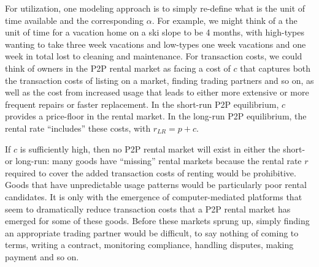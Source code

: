 \documentclass[11pt]{article}
\begin{document}
For utilization, one modeling approach is to simply re-define what is the unit of time available and the corresponding $\alpha$. 
For example, we might think of a the unit of time for a vacation home on a ski slope to be 4 months, with high-types wanting to take three week vacations and low-types one week vacations and one week in total lost to cleaning and maintenance.      
For transaction costs, we could think of owners in the P2P rental market as facing a cost of $c$ that captures both the transaction costs of listing on a market, finding trading partners and so on, as well as the cost from increased usage that leads to either more extensive or more frequent repairs or faster replacement.
In the short-run P2P equilibrium, $c$ provides a price-floor in the rental market.  
In the long-run P2P equilibrium, the rental rate ``includes'' these costs, with $r_{LR} = p + c$. 

If $c$ is sufficiently high, then no P2P rental market will exist in either the short- or long-run: 
many goods have ``missing'' rental markets because the rental rate $r$ required to cover the added transaction costs of renting would be prohibitive.
Goods that have unpredictable usage patterns would be particularly poor rental candidates.  
It is only with the emergence of computer-mediated platforms that seem to dramatically reduce transaction costs that a P2P rental market has emerged for some of these goods. 
Before these markets sprung up, simply finding an appropriate trading partner would be difficult, to say nothing of coming to terms, writing a contract, monitoring compliance, handling disputes, making payment and so on. 

\end{document}
